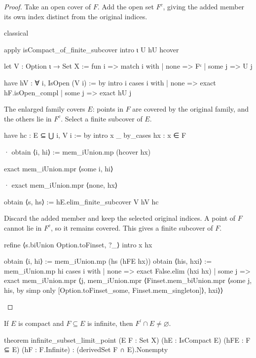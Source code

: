 \begin{proof}
  Take an open cover of $F$.
  Add the open set $F^{c}$, giving the added member its own index distinct from the original
  indices.

  \begin{lean}
    classical

    apply isCompact_of_finite_subcover
    intro ι U hU hcover

    let V : Option ι → Set X := fun i => match i with
      | none => Fᶜ
      | some j => U j

    have hV : ∀ i, IsOpen (V i) := by
      intro i
      cases i with
      | none => exact hF.isOpen_compl
      | some j => exact hU j
  \end{lean}

  The enlarged family covers $E$: points in $F$ are covered by the original family, and the others
  lie in $F^{c}$.
  Select a finite subcover of $E$.

  \begin{lean}
    have hc : E ⊆ ⋃ i, V i := by
      intro x _
      by_cases hx : x ∈ F

      · obtain ⟨i, hi⟩ := mem_iUnion.mp (hcover hx)

        exact mem_iUnion.mpr ⟨some i, hi⟩

      · exact mem_iUnion.mpr ⟨none, hx⟩

    obtain ⟨s, hs⟩ := hE.elim_finite_subcover V hV hc
  \end{lean}

  Discard the added member and keep the selected original indices.
  A point of $F$ cannot lie in $F^{c}$, so it remains covered.
  This gives a finite subcover of $F$.

  \begin{lean}
    refine ⟨s.biUnion Option.toFinset, ?_⟩
    intro x hx

    obtain ⟨i, hi⟩ := mem_iUnion.mp (hs (hFE hx))
    obtain ⟨his, hxi⟩ := mem_iUnion.mp hi
    cases i with
    | none => exact False.elim (hxi hx)
    | some j =>
      exact mem_iUnion.mpr ⟨j, mem_iUnion.mpr
        ⟨Finset.mem_biUnion.mpr
          ⟨some j, his, by simp only [Option.toFinset_some, Finset.mem_singleton]⟩, hxi⟩⟩
  \end{lean}

\end{proof}

\begin{theorem}
  \label{ma:thm:infinite-subset-of-compact-set-has-limit-point}
  If $E$ is compact and $F\subseteq E$ is infinite, then $F^{\prime}\cap E\ne\varnothing$.

  \begin{lean}
    theorem infinite_subset_limit_point (E F : Set X) (hE : IsCompact E)
        (hFE : F ⊆ E) (hF : F.Infinite) : (derivedSet F ∩ E).Nonempty
  \end{lean}
\end{theorem}


